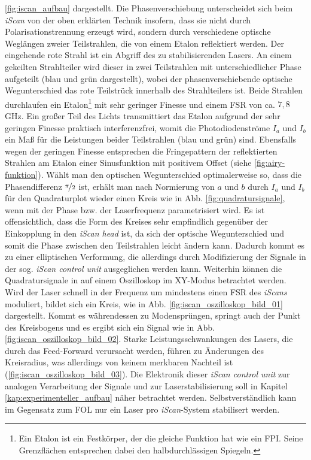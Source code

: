 \ref{fig:iscan_aufbau} dargestellt. Die Phasenverschiebung
unterscheidet sich beim \textit{iScan} von der oben erklärten Technik insofern,
dass sie nicht durch Polarisationstrennung erzeugt wird, sondern durch
verschiedene optische Weglängen zweier Teilstrahlen, die von einem Etalon
reflektiert werden. Der eingehende rote Strahl ist ein Abgriff des zu
stabilisierenden Lasers. An einem gekeilten Strahlteiler wird dieser in zwei
Teilstrahlen mit unterschiedlicher Phase aufgeteilt (blau und grün dargestellt),
wobei der phasenverschiebende optische Wegunterschied das rote Teilstrück
innerhalb des Strahlteilers ist. Beide Strahlen durchlaufen ein Etalon\footnote{Ein Etalon
ist ein Festkörper, der die gleiche Funktion hat wie ein FPI. Seine Grenzflächen
entsprechen dabei den halbdurchlässigen Spiegeln.} mit sehr geringer Finesse und
einem FSR von ca. $7,8\,$GHz. Ein großer Teil des Lichts transmittiert das
Etalon aufgrund der sehr geringen Finesse praktisch interferenzfrei, womit die
Photodiodenströme $I_a$ und $I_b$ ein Maß für die Leistungen beider Teilstrahlen
(blau und grün) sind. Ebensfalls wegen der geringen Finesse entsprechen die
Fringepattern der reflektierten Strahlen am Etalon einer Sinusfunktion mit
positivem Offset (siehe \ref{fig:airy-funktion}). Wählt man den optischen
Wegunterschied optimalerweise so, dass die Phasendifferenz $\nicefrac{\pi}{2}$
ist, erhält man nach Normierung von $a$ und $b$ durch $I_a$ und $I_b$ für den Quadraturplot
wieder einen Kreis wie in Abb. \ref{fig:quadratursignale}, wenn mit der Phase
bzw. der Laserfrequenz parametrisiert wird. Es ist offensichtlich, dass die Form
des Kreises sehr empfindlich gegenüber der Einkopplung in den \textit{iScan
head} ist, da sich der optische Wegunterschied und somit die Phase zwischen den
Teilstrahlen leicht ändern kann. Dadurch kommt es zu einer elliptischen
Verformung, die allerdings durch Modifizierung der Signale in der sog.
\textit{iScan control unit} \cite{iscan_hardware_guide} ausgeglichen werden
kann. Weiterhin können die Quadratursignale in auf einem Oszilloskop im XY-Modus
betrachtet werden. Wird der Laser schnell in der Frequenz um mindestens einen
FSR des \textit{iScans} moduliert, bildet sich ein Kreis, wie in Abb.
\ref{fig:iscan_oszilloskop_bild_01} dargestellt. Kommt es währendessen zu
Modensprüngen, springt auch der Punkt des Kreisbogens und es ergibt sich ein
Signal wie in Abb. \ref{fig:iscan_oszilloskop_bild_02}. Starke
Leistungsschwankungen des Lasers, die durch das Feed-Forward verursacht werden,
führen zu Änderungen des Kreisradius, was allerdings von keinem merkbaren
Nachteil ist (\ref{fig:iscan_oszilloskop_bild_03}). Die Elektronik dieser
\textit{iScan control unit} zur analogen Verarbeitung der Signale und zur
Laserstabilisierung soll in Kapitel \ref{kap:experimenteller_aufbau} näher betrachtet werden.
Selbstverständlich kann im Gegensatz zum FOL nur ein Laser pro
\textit{iScan}-System stabilisert werden.

